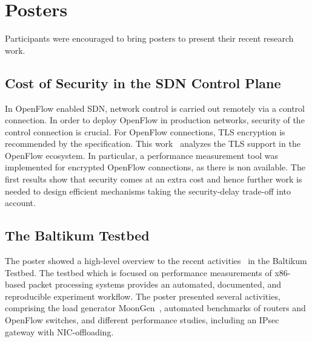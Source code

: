 \section{Posters}\label{sec:posters}

Participants were encouraged to bring posters to present
their recent research work.

\subsection{Cost of Security in the SDN Control Plane}

In OpenFlow enabled \ac{SDN}, network control is carried out remotely via a
control connection. In order to deploy OpenFlow in production networks,
security of the control connection is crucial. For OpenFlow connections, TLS
encryption is recommended by the specification. This work~\cite{wkellerer:conext:2015} analyzes the TLS support in the OpenFlow
ecosystem. In particular, a performance measurement tool was implemented for
encrypted OpenFlow connections, as there is non available. The first results
show that security comes at an extra cost and hence further work is needed to
design efficient mechanisms taking the security-delay trade-off into account.


\subsection{The Baltikum Testbed}

The poster showed a high-level overview to the recent activities~\cite{pemmerich:imc:2015, sgallenmuller:ancs:2015, draumer:cloudnet:2016,
draumer:anrw:2016} in the Baltikum Testbed. The testbed which is focused on
performance measurements of x86-based packet processing systems provides an
automated, documented, and reproducible experiment workflow. The poster
presented several activities, comprising the load generator MoonGen~\cite{pemmerich:imc:2015}, automated benchmarks of routers and OpenFlow
switches, and different performance studies, including an IPsec gateway with
NIC-offloading.

